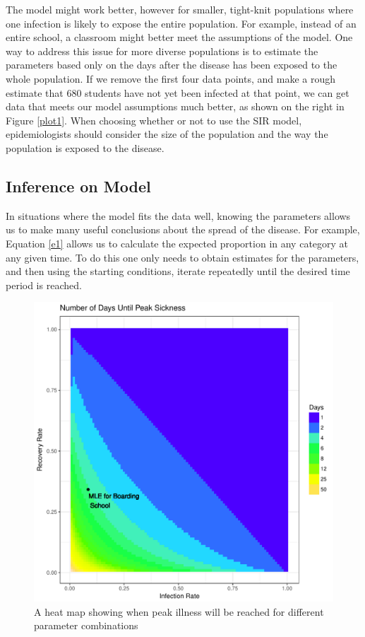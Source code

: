 \documentclass{svproc}
\begin{document}
The model might work better, however for smaller, tight-knit populations where one infection is likely to expose the entire population. For example, instead of an entire school, a classroom might better meet the assumptions of the model. One way to address this issue for more diverse populations is to estimate the parameters based only on the days after the disease has been exposed to the whole population. If we remove the first four data points, and make a rough estimate that 680 students have not yet been infected at that point, we can get data that meets our model assumptions much better, as shown on the right in Figure \ref{plot1}. When choosing whether or not to use the SIR model, epidemiologists should consider the size of the population and the way the population is exposed to the disease.



\subsection*{Inference on Model}

In situations where the model fits the data well, knowing the parameters allows us to make many useful conclusions about the spread of the disease. For example, Equation \eqref{e1} allows us to calculate the expected proportion in any category at any given time. To do this one only needs to obtain estimates for the parameters, and then using the starting conditions, iterate repeatedly until the desired time period is reached. %
\begin{figure}
\centering
\includegraphics[scale=.7]{DayGrid.pdf}
\caption{A heat map showing when peak illness will be reached for different parameter combinations}
\label{plot2}
\end{figure}
\end{document}
